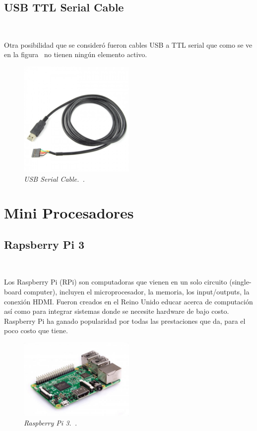 \subsection{USB TTL Serial Cable} ~

Otra posibilidad que se consideró fueron cables USB a TTL serial que como se ve en la figura~ no tienen ningún elemento activo.

\begin{figure}[h!]
  \centering
  \includegraphics[width=0.5\textwidth, keepaspectratio]{images/usb-serial-cable}
  \caption{\textit{USB Serial Cable.~\cite{USBSerialCable}.}}
  \label{fig:usb-serial-cable}
\end{figure}

\section{Mini Procesadores}

\subsection{Rapsberry Pi 3} ~

Los Raspberry Pi  (RPi) son computadoras que vienen en un solo circuito (single-board computer), incluyen el microprocesador, la memoria, los input/outputs, la conexión HDMI. Fueron creados en el Reino Unido educar acerca de computación así como para integrar sistemas donde se necesite hardware de bajo costo. Raspberry Pi ha ganado popularidad por todas las prestaciones que da, para el poco costo que tiene.

\begin{figure}[h!]
  \centering
  \includegraphics[width=0.5\textwidth, keepaspectratio]{images/rpi3}
  \caption{\textit{Raspberry Pi 3.~\cite{RPi3}.}}
  \label{fig:rpi3}
\end{figure}

